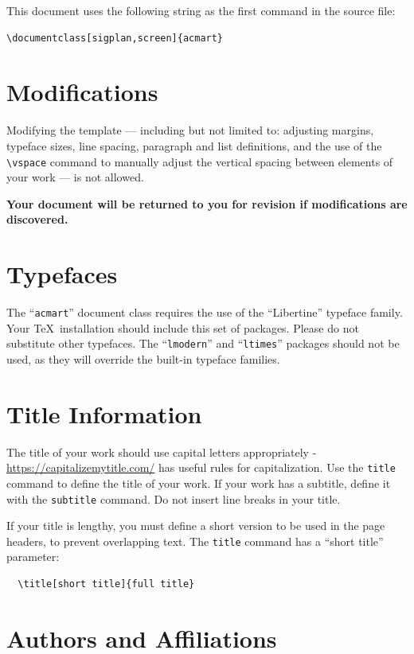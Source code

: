 \documentclass[sigplan,screen]{acmart}
\begin{document}
This document uses the following string as the first command in the
source file:
\begin{verbatim}
\documentclass[sigplan,screen]{acmart}
\end{verbatim}

\section{Modifications}

Modifying the template --- including but not limited to: adjusting
margins, typeface sizes, line spacing, paragraph and list definitions,
and the use of the \verb|\vspace| command to manually adjust the
vertical spacing between elements of your work --- is not allowed.

{\bfseries Your document will be returned to you for revision if
  modifications are discovered.}

\section{Typefaces}

The ``\verb|acmart|'' document class requires the use of the
``Libertine'' typeface family. Your \TeX\ installation should include
this set of packages. Please do not substitute other typefaces. The
``\verb|lmodern|'' and ``\verb|ltimes|'' packages should not be used,
as they will override the built-in typeface families.

\section{Title Information}

The title of your work should use capital letters appropriately -
\url{https://capitalizemytitle.com/} has useful rules for
capitalization. Use the {\verb|title|} command to define the title of
your work. If your work has a subtitle, define it with the
{\verb|subtitle|} command.  Do not insert line breaks in your title.

If your title is lengthy, you must define a short version to be used
in the page headers, to prevent overlapping text. The \verb|title|
command has a ``short title'' parameter:
\begin{verbatim}
  \title[short title]{full title}
\end{verbatim}

\section{Authors and Affiliations}
\end{document}
